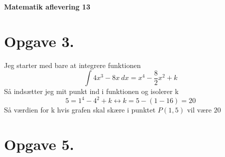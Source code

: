 \documentclass[12pt]{article}
\begin{document}
\Large{\textbf{Matematik aflevering 13}}
\normalsize

\section*{Opgave 3.}
Jeg starter med bare at integrere funktionen
$$\int 4x^3-8x \ dx = x^4-\frac{8}{2}x^2+k$$
Så indsætter jeg mit punkt ind i funktionen og isolerer k
$$5=1^4-4^2+k \leftrightarrow k=5-(1-16)=20$$
Så værdien for k hvis grafen skal skære i punktet $P(1,5)$ vil være $20$

\section*{Opgave 5.}
\end{document}
